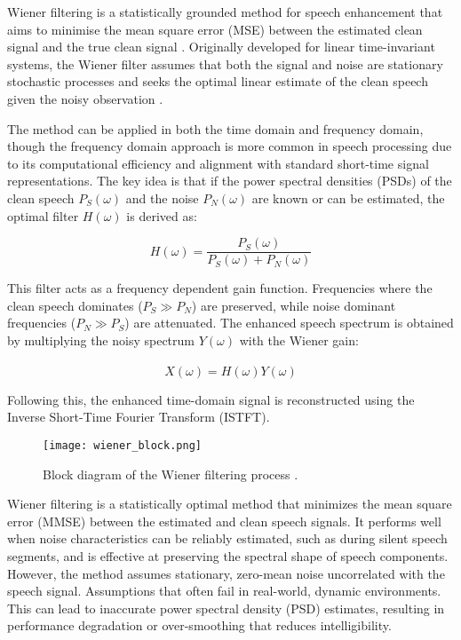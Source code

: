 Wiener filtering is a statistically grounded method for speech enhancement that aims to minimise the mean square error (MSE) between the estimated clean signal and the true clean signal \cite{loizou2013speech}. Originally developed for linear time-invariant systems, the Wiener filter assumes that both the signal and noise are stationary stochastic processes and seeks the optimal linear estimate of the clean speech given the noisy observation \cite{dubey2016evaluation}.

The method can be applied in both the time domain and frequency domain, though the frequency domain approach is more common in speech processing due to its computational efficiency and alignment with standard short-time signal representations. The key idea is that if the power spectral densities (PSDs) of the clean speech \(P_S(\omega)\) and the noise \(P_N(\omega)\) are known or can be estimated, the optimal filter \(H(\omega)\) is derived as:

\begin{equation}
    H(\omega) = \frac{P_S(\omega)}{P_S(\omega) + P_N(\omega)}
\end{equation}

This filter acts as a frequency dependent gain function. Frequencies where the clean speech dominates (\(P_S \gg P_N\)) are preserved, while noise dominant frequencies (\(P_N \gg P_S\)) are attenuated. The enhanced speech spectrum is obtained by multiplying the noisy spectrum \(Y(\omega)\) with the Wiener gain:

\begin{equation}
    \hat{X}(\omega) = H(\omega)Y(\omega)
\end{equation}

Following this, the enhanced time-domain signal is reconstructed using the Inverse Short-Time Fourier Transform (ISTFT).

\begin{figure}[h]
    \centering
    \texttt{[image: wiener\_block.png]}
    \caption{\label{fig:WienerBlock} Block diagram of the Wiener filtering process \cite{dubey2016evaluation}.}
\end{figure}

Wiener filtering is a statistically optimal method that minimizes the mean square error (MMSE) between the estimated and clean speech signals. It performs well when noise characteristics can be reliably estimated, such as during silent speech segments, and is effective at preserving the spectral shape of speech components. However, the method assumes stationary, zero-mean noise uncorrelated with the speech signal. Assumptions that often fail in real-world, dynamic environments. This can lead to inaccurate power spectral density (PSD) estimates, resulting in performance degradation or over-smoothing that reduces intelligibility.

